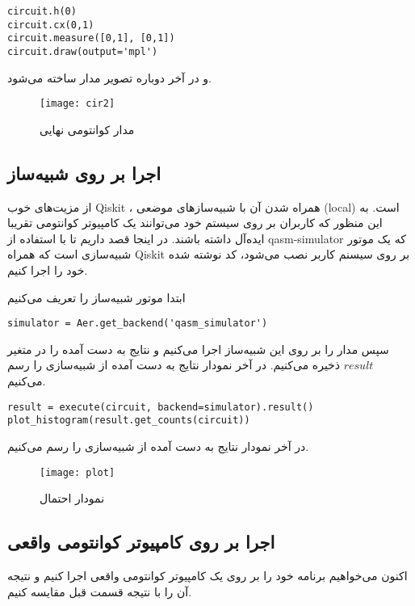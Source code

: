 \documentclass[a4paper,11pt,oneside,openany]{iut-thesis}
\begin{document}
\begin{latin}
\begin{lstlisting}[style=Mypython]
circuit.h(0)
circuit.cx(0,1)
circuit.measure([0,1], [0,1])
circuit.draw(output='mpl')
\end{lstlisting}
\end{latin}
و در آخر دوباره تصویر مدار ساخته می‌شود.

\begin{figure}[h]
	\centering
	\texttt{[image: cir2]}
	\caption{
	مدار کوانتومی نهایی 
	}
	\label{cir2}
\end{figure} 

\newpage


\subsection{
اجرا بر روی شبیه‌ساز
}

از مزیت‌های خوب Qiskit ، همراه شدن آن با شبیه‌سازهای موضعی (local) است. به این منظور که کاربران بر روی سیستم خود می‌توانند یک کامپیوتر کوانتومی تقریبا ایده‌آل داشته باشند. در اینجا قصد داریم تا با استفاده از qasm-simulator که یک موتور شبیه‌سازی است که همراه Qiskit بر روی سیسنم کاربر نصب می‌شود، کد نوشته شده خود را اجرا کنیم.

ابتدا موتور شبیه‌ساز را تعریف می‌کنیم
\begin{latin}
\begin{lstlisting}[style=Mypython]
simulator = Aer.get_backend('qasm_simulator')
\end{lstlisting}
\end{latin}

سپس مدار را بر روی این شبیه‌ساز اجرا می‌کنیم و نتایج به دست آمده را در متغیر$result$  ذخیره می‌کنیم. در آخر نمودار نتایج به دست آمده از شبیه‌سازی را رسم می‌کنیم.

\begin{latin}
\begin{lstlisting}[style=Mypython]
result = execute(circuit, backend=simulator).result()
plot_histogram(result.get_counts(circuit))
\end{lstlisting}
\end{latin}
در آخر نمودار نتایج به دست آمده از شبیه‌سازی را رسم می‌کنیم.
\begin{figure}[h]
	\centering
	\texttt{[image: plot]}
	\caption{
	نمودار احتمال
	}
	\label{plot}
\end{figure} 

\subsection{
اجرا بر روی کامپیوتر کوانتومی واقعی
}
اکنون می‌خواهیم برنامه خود را بر روی یک کامپیوتر کوانتومی واقعی اجرا کنیم و نتیجه آن را با نتیجه قسمت قبل مقایسه کنیم.
\end{document}
